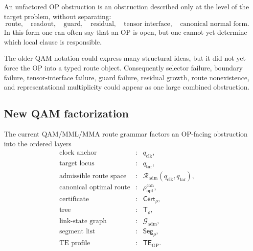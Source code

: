 \begin{definition}
\label{def:v410r17-unfactored-op-obstruction}
An unfactored OP obstruction is an obstruction described only at the level of
the target problem, without separating:
\[
 \text{route},\quad
 \text{readout},\quad
 \text{guard},\quad
 \text{residual},\quad
 \text{tensor interface},\quad
 \text{canonical normal form}.
\]
In this form one can often say that an OP is open, but one cannot yet determine
which local clause is responsible.
\end{definition}

\begin{remark}
\label{rem:v410r17-why-old-qam-was-slower}
The older QAM notation could express many structural ideas, but it did not yet
force the OP into a typed route object. Consequently selector failure,
boundary failure, tensor-interface failure, guard failure, residual growth,
route nonexistence, and representational multiplicity could appear as one large
combined obstruction.
\end{remark}

\subsection{New QAM factorization}
\label{subsec:v410r17-new-qam-factorization}

\begin{definition}
\label{def:v410r17-qam-route-factorization}
The current QAM/MML/MMA route grammar factors an OP-facing obstruction into the
ordered layers
\[
\begin{array}{rcl}
\text{clock anchor} &:& q_{\mathrm{clk}},\\
\text{target locus} &:& q_{\mathrm{tar}},\\
\text{admissible route space} &:&
 \mathcal R_{\mathrm{adm}}(q_{\mathrm{clk}},q_{\mathrm{tar}}),\\
\text{canonical optimal route} &:&
 \rho_{\mathrm{opt}}^{\mathrm{can}},\\
\text{certificate} &:&
 \mathsf{Cert}_{\rho},\\
\text{tree} &:&
 \mathsf T_{\rho},\\
\text{link-state graph} &:&
 \mathcal G_{\mathrm{adm}},\\
\text{segment list} &:&
 \mathsf{Seg}_{\rho},\\
\text{TE profile} &:&
 \mathsf{TE}_{\mathrm{OP}}.
\end{array}
\]
\end{definition}

